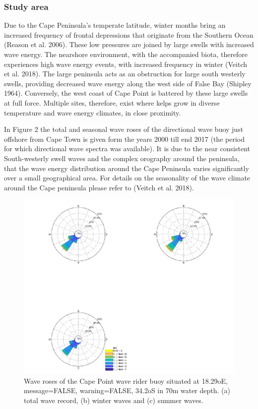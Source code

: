\documentclass[10pt,a4,]{article}
\makeatletter
\def\maxwidth{\ifdim\Gin@nat@width>\linewidth\linewidth
\else\Gin@nat@width\fi}
\let\Oldincludegraphics\includegraphics
\renewcommand{\includegraphics}[1]{\Oldincludegraphics[width=\maxwidth]{#1}}
\makeatother
\begin{document}
\hypertarget{study-area}{%
\subsubsection{Study area}\label{study-area}}

Due to the Cape Peninsula's temperate latitude, winter months bring an
increased frequency of frontal depressions that originate from the
Southern Ocean (Reason et al. 2006). These low pressures are joined by
large swells with increased wave energy. The nearshore environment, with
the accompanied biota, therefore experiences high wave energy events,
with increased frequency in winter (Veitch et al. 2018). The large
peninsula acts as an obstruction for large south westerly swells,
providing decreased wave energy along the west side of False Bay
(Shipley 1964). Conversely, the west coast of Cape Point is battered by
these large swells at full force. Multiple sites, therefore, exist where
kelps grow in diverse temperature and wave energy climates, in close
proximity.

In Figure 2 the total and seasonal wave roses of the directional wave
buoy just offshore from Cape Town is given form the years 2000 till end
2017 (the period for which directional wave spectra was available). It
is due to the near consistent South-westerly swell waves and the complex
orography around the peninsula, that the wave energy distribution around
the Cape Peninsula varies significantly over a small geographical area.
For details on the seasonality of the wave climate around the Cape
peninsula please refer to (Veitch et al. 2018).

\begin{figure}
\centering
\includegraphics{chapter_2_files/figure-latex/unnamed-chunk-2-1.pdf}
\caption{Wave roses of the Cape Point wave rider buoy situated at
18.29oE, message=FALSE, warning=FALSE, 34.2oS in 70m water depth. (a)
total wave record, (b) winter waves and (c) summer waves.}
\end{figure}
\end{document}
